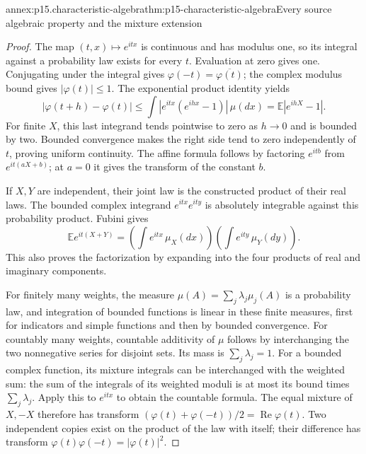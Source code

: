 \begin{annexitem}{annex:p15.characteristic-algebra}{thm:p15-characteristic-algebra}{Every source algebraic property and the mixture extension}
\begin{proof}
The map \((t,x)\mapsto e^{itx}\) is continuous and has
modulus one, so its integral against a probability law
exists for every \(t\). Evaluation at zero gives one.
Conjugating under the integral gives
\(\varphi(-t)=\overline{\varphi(t)}\); the complex
modulus bound gives \(|\varphi(t)|\leq1\).
The exponential product identity yields
\[
 |\varphi(t+h)-\varphi(t)|
 \leq\int|e^{itx}(e^{ihx}-1)|\,\mu(dx)
 =\mathbb E|e^{ihX}-1|.
\]
For finite \(X\), this last integrand tends pointwise
to zero as \(h\to0\) and is bounded by two.
Bounded convergence makes the right side tend to zero
independently of \(t\), proving uniform continuity.
The affine formula follows by factoring \(e^{itb}\)
from \(e^{it(aX+b)}\); at \(a=0\) it gives the transform
of the constant \(b\).

If \(X,Y\) are independent, their joint law is the
constructed product of their real laws. The bounded
complex integrand \(e^{itx}e^{ity}\) is absolutely
integrable against this probability product.
Fubini gives
\[
 \mathbb E e^{it(X+Y)}
   =\left(\int e^{itx}\,\mu_X(dx)\right)
      \left(\int e^{ity}\,\mu_Y(dy)\right).
\]
This also proves the factorization by expanding into
the four products of real and imaginary components.

For finitely many weights, the measure
\(\mu(A)=\sum_j\lambda_j\mu_j(A)\) is a probability law,
and integration of bounded functions is linear in these
finite measures, first for indicators and simple functions
and then by bounded convergence.
For countably many weights, countable additivity of
\(\mu\) follows by interchanging the two nonnegative
series for disjoint sets. Its mass is \(\sum_j\lambda_j=1\).
For a bounded complex function, its mixture integrals
can be interchanged with the weighted sum: the sum of
the integrals of its weighted moduli is at most its
bound times \(\sum_j\lambda_j\).
Apply this to \(e^{itx}\) to obtain the countable formula.
The equal mixture of \(X,-X\) therefore has transform
\((\varphi(t)+\varphi(-t))/2=\operatorname{Re}\varphi(t)\).
Two independent copies exist on the product of the law
with itself; their difference has transform
\(\varphi(t)\varphi(-t)=|\varphi(t)|^2\).
\end{proof}
\end{annexitem}

